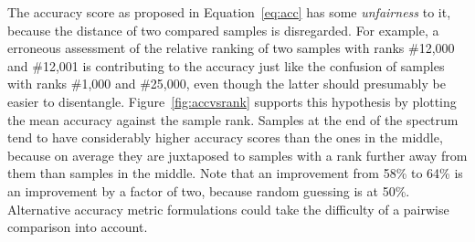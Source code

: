 The accuracy score as proposed in Equation~\ref{eq:acc} has some \textit{unfairness} to it, because the distance of two compared samples is disregarded. For example, a erroneous assessment of the relative ranking of two samples with ranks \#12,000 and \#12,001 is contributing to the accuracy just like the confusion of samples with ranks \#1,000 and \#25,000, even though the latter should presumably be easier to disentangle. Figure~\ref{fig:accvsrank} supports this hypothesis by plotting the mean accuracy against the sample rank. Samples at the end of the spectrum tend to have considerably higher accuracy scores than the ones in the middle, because on average they are juxtaposed to samples with a rank further away from them than samples in the middle. Note that an improvement from 58\% to 64\% is an improvement by a factor of two, because random guessing is at 50\%.
Alternative accuracy metric formulations could take the difficulty of a pairwise comparison into account.

